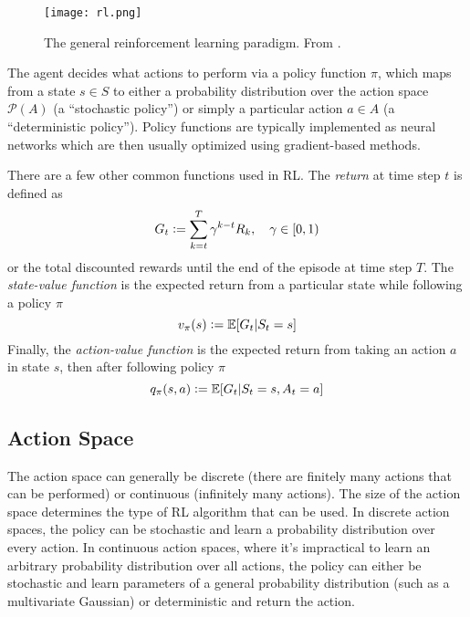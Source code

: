 \begin{figure}[H]
    \centering
    \texttt{[image: rl.png]}
    \caption{The general reinforcement learning paradigm. From \cite{sutton2018reinforcement}.}
    \label{fig:RL}
\end{figure}

The agent decides what actions to perform via a policy function $\pi$, which maps from a state $s \in S$ to either a probability distribution over the action space $\mathcal{P}(A)$ (a ``stochastic policy'') or simply a particular action $a \in A$ (a ``deterministic policy''). Policy functions are typically implemented as neural networks which are then usually optimized using gradient-based methods.

There are a few other common functions used in RL. The \emph{return} at time step $t$ is defined as
\begin{equation}\label{eq:return}
    G_t \mathrel{\mathop:}= \sum_{k=t}^T \gamma^{k-t} R_k, \quad \gamma \in [0,1)
\end{equation}
or the total discounted rewards until the end of the episode at time step $T$. The \emph{state-value function} is the expected return from a particular state while following a policy $\pi$
\begin{equation}\label{eq:state_value}
    v_\pi(s) \mathrel{\mathop:}= \mathbb E[G_t | S_t = s]
\end{equation}
Finally, the \emph{action-value function} is the expected return from taking an action $a$ in state $s$, then after following policy $\pi$
\begin{equation}\label{eq:action_value}
    q_\pi(s, a) \mathrel{\mathop:}= \mathbb E[G_t | S_t = s, A_t = a]
\end{equation}

\subsection{Action Space}

The action space can generally be discrete (there are finitely many actions that can be performed) or continuous  (infinitely many actions). The size of the action space determines the type of RL algorithm that can be used. In discrete action spaces, the policy can be stochastic and learn a probability distribution over every action. In continuous action spaces, where it's impractical to learn an arbitrary probability distribution over all actions, the policy can either be stochastic and learn parameters of a general probability distribution (such as a multivariate Gaussian) or deterministic and return the action.


